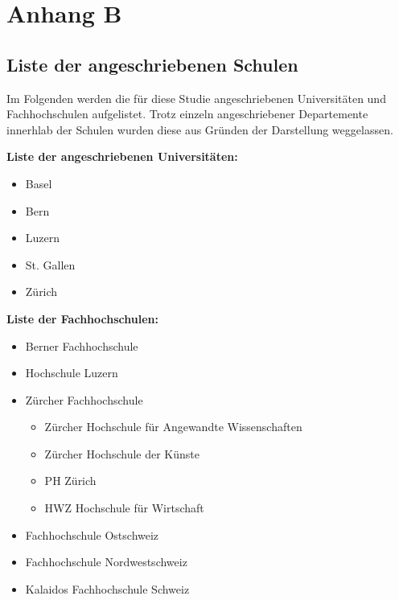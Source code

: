 %
%
\glsresetall

\let\raggedsection\centering 
\chapter{Anhang B}\label{chap.appendix_schulListe}
\let\raggedsection\raggedright 
\begin{RaggedRight}
\section*{Liste der angeschriebenen Schulen}\label{appendix.ListeSchulen}
Im Folgenden werden die für diese Studie angeschriebenen Universitäten und Fachhochschulen aufgelistet. Trotz einzeln angeschriebener Departemente innerhlab der Schulen wurden diese aus Gründen der Darstellung weggelassen.\par
\textbf{Liste der angeschriebenen Universitäten:}
\begin{itemize}
    \item Basel
    \item Bern
    \item Luzern
    \item St. Gallen
    \item Zürich
\end{itemize}
\textbf{Liste der Fachhochschulen:}
\begin{itemize}
    \item Berner Fachhochschule
    \item Hochschule Luzern
    \item Zürcher Fachhochschule
    \begin{itemize}
        \item Zürcher Hochschule für Angewandte Wissenschaften
        \item Zürcher Hochschule der Künste
        \item PH Zürich
        \item HWZ Hochschule für Wirtschaft
    \end{itemize}
    \item Fachhochschule Ostschweiz
    \item Fachhochschule Nordwestschweiz 
    \item Kalaidos Fachhochschule Schweiz
\end{itemize}

\end{RaggedRight}
